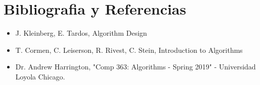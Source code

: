\section{Bibliografia y Referencias}
\begin{itemize}
    \item J. Kleinberg, E. Tardos, Algorithm Design
    \item T. Cormen, C. Leiserson, R. Rivest, C. Stein, Introduction to Algorithms
    \item  Dr. Andrew Harrington, "Comp 363: Algorithms - Spring 2019" - Universidad Loyola Chicago.
\end{itemize}
